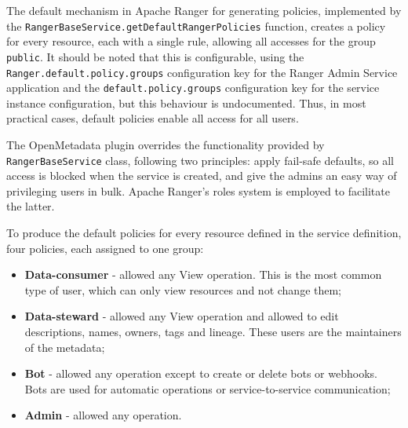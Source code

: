 The default mechanism in Apache Ranger for generating policies, implemented by the \texttt{RangerBaseService.getDefaultRangerPolicies} function, creates a policy for every resource, each with a single rule, allowing all accesses for the group \texttt{public}. It should be noted that this is configurable, using the \texttt{Ranger.default.policy.groups} configuration key for the Ranger Admin Service application and the \texttt{default.policy.groups} configuration key for the service instance configuration, but this behaviour is undocumented. Thus, in most practical cases, default policies enable all access for all users.

The OpenMetadata plugin overrides the functionality provided by \texttt{RangerBaseService} class, following two principles: apply fail-safe defaults, so all access is blocked when the service is created, and give the admins an easy way of privileging users in bulk. Apache Ranger's roles system is employed to facilitate the latter.

To produce the default policies for every resource defined in the service definition, four policies, each assigned to one group:
\begin{itemize}
    \item \textbf{Data-consumer} - allowed any View operation. This is the most common type of user, which can only view resources and not change them;
    \item \textbf{Data-steward} - allowed any View operation and allowed to edit descriptions, names, owners, tags and lineage. These users are the maintainers of the metadata;
    \item \textbf{Bot} - allowed any operation except to create or delete bots or webhooks. Bots are used for automatic operations or service-to-service communication;
    \item \textbf{Admin} - allowed any operation.
\end{itemize}